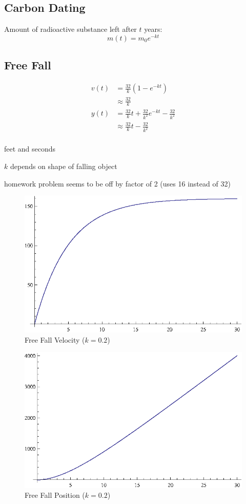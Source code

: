 \documentclass{exam}
\begin{document}
  \subsection{Carbon Dating}

  Amount of radioactive substance left after $t$ years:
  \[
    m(t) = m_0 e^{-kt}
  \]

  \pagebreak

  \subsection{Free Fall}

  \begin{align*}
    v(t) &= \frac{32}{k} \left( 1 - e^{-kt} \right) \\
         &\approx \frac{32}{k} \\
    y(t) &= \frac{32}{k} t + \frac{32}{k^2} e^{-kt} - \frac{32}{k^2} \\
         &\approx \frac{32}{k} t - \frac{32}{k^2} \\
  \end{align*}

  \begin{itemize*}
    \item feet and seconds
    \item $k$ depends on shape of falling object
    \item homework problem seems to be off by factor of 2 (uses 16 instead of 32)
  \end{itemize*}

  \begin{figure}[h]
    \centering
    \includegraphics[scale=0.9]{freeFallVelocity.eps}
    \caption{Free Fall Velocity ($k = 0.2$)}
  \end{figure}

  \begin{figure}[h]
    \centering
    \includegraphics[scale=0.9]{freeFallPosition.eps}
    \caption{Free Fall Position ($k = 0.2$)}
  \end{figure}
\end{document}
